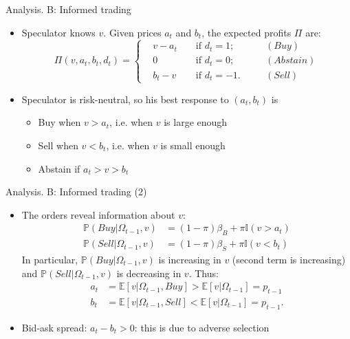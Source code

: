 \documentclass[english,10pt]{beamer}
\begin{document}
\begin{frame}{Analysis. B: Informed trading}
\begin{itemize}
	\item Speculator knows $v$. Given prices $a_t$ and $b_t$, the expected profits $\Pi$ are:
	\begin{equation*}
		\Pi(v,a_t,b_t,d_t)= \left\{
		\begin{aligned}
		&v - a_t  	&& \text{ if } d_t=1; \quad && (Buy)\\
		&0			&&\text{ if } d_t=0; \quad && (Abstain)\\
		&b_t - v 	&& \text{ if } d_t=-1. \quad && (Sell)
		\end{aligned}
		\right.
	\end{equation*}
	\item Speculator is risk-neutral, so his best response to $(a_t,b_t)$ is
	\begin{itemize}
		\item Buy when $v > a_t$, i.e. when $v$ is large enough
		\item Sell when $v<b_t$, i.e. when $v$ is small enough
		\item Abstain if $a_t > v > b_t$
	\end{itemize}
\end{itemize}
\end{frame}


\begin{frame}{Analysis. B: Informed trading (2)}
	\begin{itemize}
		\item The orders reveal information about $v$:
		\begin{align*}
			\mathbb{P}(Buy|\Omega_{t-1}, v) & = (1-\pi) \beta_B + \pi \mathbb{I}(v>a_t) \\
			\mathbb{P}(Sell|\Omega_{t-1}, v)  & = (1-\pi) \beta_S + \pi \mathbb{I}(v<b_t)
		\end{align*}
		In particular, $\mathbb{P}(Buy|\Omega_{t-1}, v)$ is increasing in $v$ (second term is increasing) and $\mathbb{P}(Sell|\Omega_{t-1}, v)$ is decreasing in $v$. Thus:
		\begin{align*}
			a_t & = \mathbb{E}[v|\Omega_{t-1}, Buy] > \mathbb{E}[v|\Omega_{t-1}] = p_{t-1} \\
			b_t & = \mathbb{E}[v|\Omega_{t-1}, Sell] < \mathbb{E}[v|\Omega_{t-1}] = p_{t-1}.
		\end{align*}
		\item Bid-ask spread: $a_t - b_t >0$: this is due to \alert{adverse selection}
	\end{itemize}
\end{frame}
\end{document}
